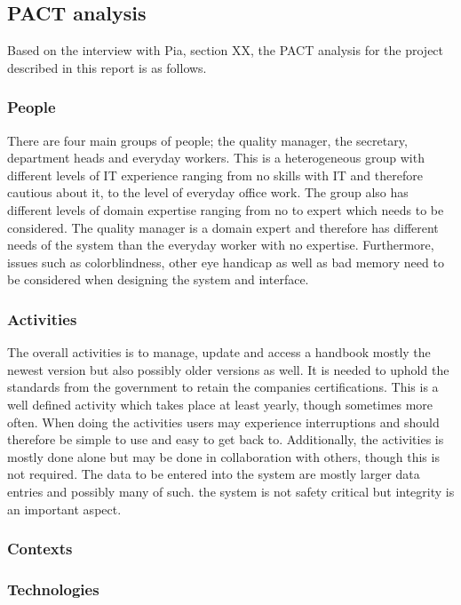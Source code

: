 \subsection{PACT analysis}\label{sec:PACT-analysis}
Based on the interview
with Pia,
{\color{red} section XX}, the PACT analysis for the project described in this report is as follows.

\subsubsection*{People}

There are four main groups of people; the quality manager, the secretary, department heads and everyday workers.
This is a heterogeneous group with different levels of IT experience ranging from no skills with IT and therefore cautious about it, to the level of everyday office work.
The group also has different levels of domain expertise ranging from no to expert which needs to be considered. The quality manager is a domain expert and therefore has different needs of the system than the everyday worker with no expertise.
\newline
Furthermore, issues such as colorblindness, other eye handicap as well as bad memory need to be considered when designing the system and interface.


\subsubsection*{Activities}
The overall activities is to manage, update and access a handbook mostly the newest version but also possibly older versions as well. It is needed to uphold the standards from the government to retain the companies certifications.
This is a well defined activity
which takes place at least yearly, though sometimes more often.
When doing the activities users may experience interruptions and should therefore be simple to use and easy to get back to.
Additionally, the activities is mostly done alone but may be done in collaboration with others, though this is not required.
\newline
The data to be entered into the system are mostly larger data entries and possibly many of such.
the system is not safety critical but integrity is an important aspect.

\subsubsection*{Contexts}


\subsubsection*{Technologies}














